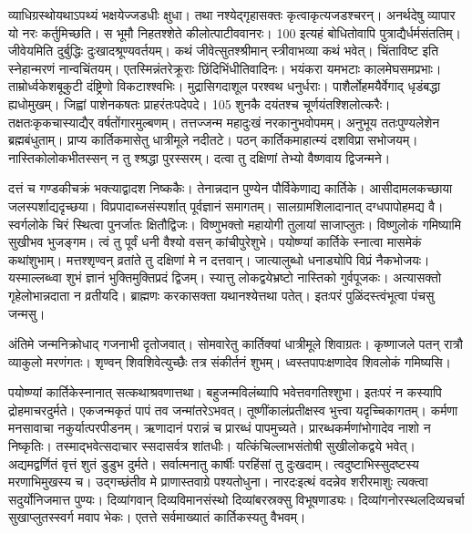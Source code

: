 व्याधिग्रस्थोयथाऽपथ्यं भक्षयेज्जडधीः क्षुधा।
 तथा नश्येद्गृहासक्तः कृत्वाकृत्यजडश्चरन्।
 अनर्थदेषु व्यापार यो नरः कर्तुमिच्छति।
 स भूमौ निहतश्शेते कीलोत्पाटीववानरः।
 100 इत्यहं बोधितोवापि पुत्राद्यैर्धर्मसंततिम्।
 जीवेयमिति दुर्बुद्धिः दुःखादश्रूण्यवर्तयम्।
 कथं जीवेत्सुतश्श्रीमान् स्त्रीवाभव्या कथं भवेत्।
 चिंताविष्ट इति स्नेहान्मरणं नान्वचिंतयम्।
 एतस्मिन्नंतरेक्रूराः छिंदिभिंधीतिवादिनः।
 भयंकरा यमभटाः कालमेघसमप्रभाः।
 ताम्रोर्ध्वकेशबूकुटी दंष्ट्रिणो विकटाश्श्वभिः।
 मुद्रासिगदाशूल परश्वथ धनुर्धराः।
 पाशैर्लोहमयैर्वेगाद् धृडंबद्धा ह्यधोमुखम्।
 जिह्वां पाशेनकषतः प्राहरंतःपदेपदे।
 105 शुनकै दयंतश्च चूर्णयंतश्शिलोत्करैः।
 तक्षतःकृकचास्याद्यैर् वर्षतोंगारमुल्बणम्।
 तत्तज्जन्म महादुःखं नरकानुभवोपमम्।
 अनुभूय ततःपुण्यलेशेन ब्रह्मबंधुताम्।
 प्राप्य कार्तिकमासेतु धात्रीमूले नदीतटे।
 पठन् कार्तिकमाहात्म्यं दशविप्रा सभोजयम्।
 नास्तिकोलोकभीतस्सन् न तु श्श्रद्धा पुरस्सरम्।
 दत्वा तु दक्षिणां तेभ्यो वैष्णवाय द्विजन्मने।
 
दत्तं च गण्डकीचक्रं भक्त्याद्वादश निष्ककैः।
 तेनान्नदान पुण्येन पौर्विकेणाद्य कार्तिके।
 आसीदामलकच्छाया जलस्पर्शाद्यदृच्छया।
 विप्रपादाब्जसंस्पर्शात् पूर्वज्ञानं समागतम्।
 सालग्रामशिलादानात् दग्धपापोहमद्य वै।
 स्वर्गलोके चिरं स्थित्वा पुनर्जातः क्षितौद्विजः।
 विष्णुभक्तो महायोगी तुलायां साजाप्लुतः।
 विष्णुलोकं गमिष्यामि सुखीभव भुजङ्गम।
 त्वं तु पूर्वं धनी वैश्यो वसन् कांचीपुरेशुभे।
 पयोष्ण्यां कार्तिके स्नात्वा मासमेकं कथांशुभाम्।
 मत्तश्शृण्वन् व्रतांते तु दक्षिणां मे न दत्तवान्।
 जात्यालुब्धो धनाड्योपि विप्रं नैकभोजयः।
 यस्माल्लब्ध्वा शुभं ज्ञानं भुक्तिमुक्तिप्रदं द्विजम्।
 स्यात्तु लोकद्वयेभ्रष्टो नास्तिको गुर्वपूजकः।
 अत्यासक्तो गृहेलोभान्नदाता न व्रतीयदि।
 ब्राह्मणः करकासक्ता यथानश्येत्तथा पतेत्।
 इतःपरं पुळिंदस्त्वंभूत्वा पंचसु जन्मसु।
 
अंतिमे जन्मनिक्रोधाद् गजनाभी दृतोजवात्।
 सोमवारेतु कार्तिक्यां धात्रीमूले शिवाग्रतः।
 कृष्णाजले पतन् रात्रौ व्याकुलो मरणंगतः।
 शृण्वन् शिवशिवेत्युच्छैः तत्र संकीर्तनं शुभम्।
 ध्वस्तपापःक्षणादेव शिवलोकं गमिष्यसि।
 
पयोष्ण्यां कार्तिकेस्नानात् सत्कथाश्रवणात्तथा।
 बहुजन्मविलंब्यापि भवेत्तवगतिश्शुभा।
 इतःपरं न कस्यापि द्रोहमाचरदुर्मते।
 एकजन्मकृतं पापं तव जन्मांतरेऽभवत्।
 तूष्णींकालंप्रतीक्षस्व भुत्त्वा यदृच्चिकागतम्।
 कर्मणा मनसावाचा नकुर्यात्परपीडनम्।
 ऋणादानं परान्नं च प्रारब्धं पापमुच्यते।
 प्रारब्धकर्मणांभोगादेव नाशो न निष्कृतिः।
 तस्माद्भवेत्सदाचार स्सदासर्वत्र शांतधीः।
 यत्किंचिल्लाभसंतोषी सुखीलोकद्वये भवेत्।
 अद्यमद्वर्णितं वृत्तं शुतं डुडुभ दुर्मते।
 सर्वात्मनातु कार्षीः परहिंसां तु दुःखदाम्।
 त्वदुष्टाभिस्सुदष्टस्य मरणाभिमुखस्य च।
 उद्गच्छंतीव मे प्राणास्तवाग्रे पश्यतोधुना।
 नारदःइत्थं वदन्नेव शरीरमाशुः त्यक्त्वा
सदुर्योनिजमात्त पुण्यः।
 दिव्यांगवान् दिव्यविमानसंस्थो
दिव्यांबरस्रक्सु विभूषणाड्यः।
 दिव्यांगनोरस्थलदिव्यचर्चा
सुखाप्लुतस्स्वर्ग मवाप भेकः।
 एतत्ते सर्वमाख्यातं कार्तिकस्यतु वैभवम्।
 

